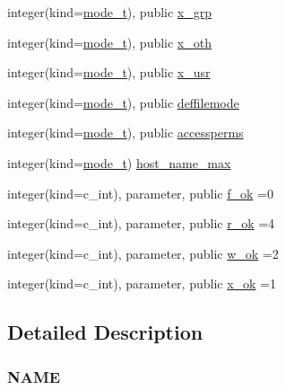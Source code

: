 \begin{DoxyCompactItemize}
\item 
integer(kind=\mbox{\hyperlink{namespacem__system_abdb5cc27c945379d844db4830d499050}{mode\+\_\+t}}), public \mbox{\hyperlink{namespacem__system_ae405a76caed1088a151c437d66d80eb0}{x\+\_\+grp}}
\item 
integer(kind=\mbox{\hyperlink{namespacem__system_abdb5cc27c945379d844db4830d499050}{mode\+\_\+t}}), public \mbox{\hyperlink{namespacem__system_a5863ec37dc7d85f9c3f20cc511d26bb4}{x\+\_\+oth}}
\item 
integer(kind=\mbox{\hyperlink{namespacem__system_abdb5cc27c945379d844db4830d499050}{mode\+\_\+t}}), public \mbox{\hyperlink{namespacem__system_a450a3fddafad75b241f370b47b17d97c}{x\+\_\+usr}}
\item 
integer(kind=\mbox{\hyperlink{namespacem__system_abdb5cc27c945379d844db4830d499050}{mode\+\_\+t}}), public \mbox{\hyperlink{namespacem__system_a04a5b1ef384bcbb8ad3b0c81ce95001a}{deffilemode}}
\item 
integer(kind=\mbox{\hyperlink{namespacem__system_abdb5cc27c945379d844db4830d499050}{mode\+\_\+t}}), public \mbox{\hyperlink{namespacem__system_a82a13cb7ac2c5f0e6e34fc3cfc010d42}{accessperms}}
\item 
integer(kind=\mbox{\hyperlink{namespacem__system_abdb5cc27c945379d844db4830d499050}{mode\+\_\+t}}) \mbox{\hyperlink{namespacem__system_a6501a3671053239dae9b69b95c0a5f55}{host\+\_\+name\+\_\+max}}
\item 
integer(kind=c\+\_\+int), parameter, public \mbox{\hyperlink{namespacem__system_ad34c4f18dd5b7dbe445cca25bbae9a74}{f\+\_\+ok}} =0
\item 
integer(kind=c\+\_\+int), parameter, public \mbox{\hyperlink{namespacem__system_a86ca380e22d30a8795b4d99f1836ece8}{r\+\_\+ok}} =4
\item 
integer(kind=c\+\_\+int), parameter, public \mbox{\hyperlink{namespacem__system_a8f34e61e94106b90ca48b9ef1165474c}{w\+\_\+ok}} =2
\item 
integer(kind=c\+\_\+int), parameter, public \mbox{\hyperlink{namespacem__system_a0eca0d5b431ad6fbde6f40407550e7aa}{x\+\_\+ok}} =1
\end{DoxyCompactItemize}


\subsection{Detailed Description}
\subsubsection*{N\+A\+ME}

